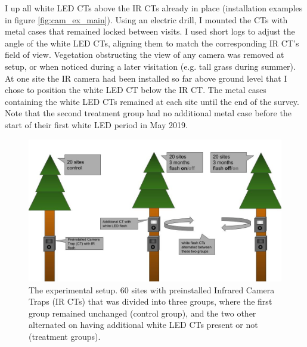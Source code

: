 I up all white LED CTs above the IR CTs already in place (installation examples in figure \ref{fig:cam_ex_main}).
Using an electric drill, I mounted the CTs with metal cases that remained locked between visits.
I used short logs to adjust the angle of the white LED CTs, aligning them to match the corresponding IR CT's field of view.
Vegetation obstructing the view of any camera was removed at setup, or when noticed during a later visitation (e.g. tall grass during summer).
At one site the IR camera had been installed so far above ground level that I chose to position the white LED CT below the IR CT. %
The metal cases containing the white LED CTs remained at each site until the end of the survey. Note that the second treatment group had no additional metal case before the start of their first white LED period in May 2019.

\begin{figure}
	\begin{center}
		\includegraphics[width=\textwidth]{./img/cam_example/experiment_setup.jpg} %
	\end{center}
	\caption[The experimental setup]
	{The experimental setup.  \small %
		60 sites with preinstalled Infrared Camera Traps (IR CTs) that was divided into three groups, where the first group remained unchanged (control group), and the two other alternated on having additional white LED CTs present or not (treatment groups).}
	\label{fig:exp_set}
\end{figure} 

